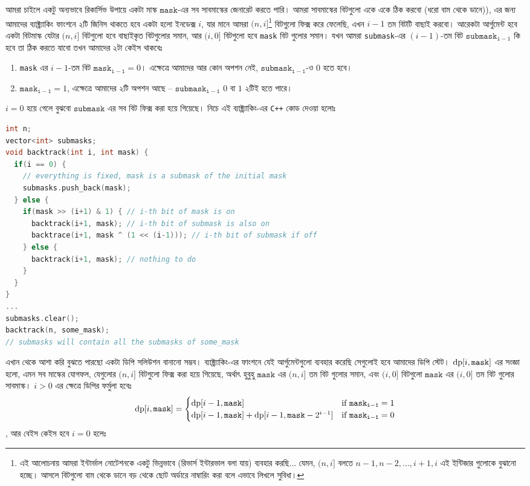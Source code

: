 আমরা চাইলে একটু অন্যভাবে রিকার্সিভ উপায়ে একটা মাস্ক $\mathtt{mask}$-এর সব
সাবমাস্কের জেনারেট
করতে পারি। আমরা সাবমাস্কের বিটগুলো একে একে ঠিক করবো (ধরো বাম থেকে ডানে)), এর
জন্য আমাদের ব্যাক্ট্র্যাকিং ফাংশনে ২টি জিনিস থাকতে হবে একটা হলো ইনডেক্স $i$,
যার মানে আমরা $(n, i]$\footnote{এই আলোচনায় আমরা ইন্টার্ভাল নোটেশনকে একটু
ভিন্নভাবে (রিভার্স ইন্টারভাল বলা যায়) ব্যবহার করছি$\ldots$ যেমন, $(n, i]$
বলতে
$n-1, n-2, \ldots, i+1, i$ এই ইন্টিজার গুলোকে বুঝানো হচ্ছে। আসলে বিটগুলো বাম
থেকে ডানে বড় থেকে ছোট অর্ডারে নাম্বারিং করা বলে এভাবে লিখলে সুবিধা।}
বিটগুলো ফিক্স করে ফেলেছি, এখন $i-1$ তম বিটটি বাছাই
করবো। আরেকটা আর্গুমেন্ট হবে একটা বিটমাস্ক যেটার $(n, i]$ বিটগুলো হবে বাছাইকৃত
বিটগুলোর সমান, আর $(i, 0]$ বিটগুলো হবে \texttt{mask} বিট গুলোর সমান। যখন আমরা
\texttt{submask}-এর $(i-1)$-তম বিট $\mathtt{submask_{i-1}}$ কি হবে তা ঠিক
করতে যাবো তখন আমাদের ২টা কেইস থাকবেঃ
\begin{enumerate}
  \item \texttt{mask} এর $i-1$-তম বিট $\mathtt{mask_{i-1}} = 0$। এক্ষেত্রে
  আমাদের আর কোন অপশন নেই, $\mathtt{submask_{i-1}}$-ও $0$ হতে হবে।
  \item $\mathtt{mask_{i-1}} = 1$, এক্ষেত্রে আমাদের ২টি অপশন আছে --
  $\mathtt{submask_{i-1}}$ $0$ বা $1$ ২টিই হতে পারে।
\end{enumerate}
$i = 0$ হয়ে গেলে বুঝবো $\mathtt{submask}$ এর সব বিট ফিক্স করা হয়ে গিয়েছে।
নিচে এই ব্যাক্ট্র্যাকিং-এর \texttt{C++} কোড দেওয়া হলোঃ
\begin{lstlisting}[language=C++]
int n;
vector<int> submasks;
void backtrack(int i, int mask) {
  if(i == 0) {
    // everything is fixed, mask is a submask of the initial mask
    submasks.push_back(mask);
  } else {
    if(mask >> (i+1) & 1) { // i-th bit of mask is on
      backtrack(i+1, mask); // i-th bit of submask is also on
      backtrace(i+1, mask ^ (1 << (i-1))); // i-th bit of submask if off
    } else {
      backtrack(i+1, mask); // nothing to do
    }
  }
}
...
submasks.clear();
backtrack(n, some_mask);
// submasks will contain all the submasks of some_mask
\end{lstlisting}
এখান থেকে আশা করি বুঝতে পারছো একটা ডিপি সলিউশন বানানো সম্ভব।
ব্যাক্ট্র্যাকিং-এর ফাংশনে যেই আর্গুমেন্টগুলো ব্যবহার করেছি সেগুলোই হবে আমাদের
ডিপি স্টেট। $\text{dp}[i, \mathtt{mask}]$ এর সংজ্ঞা হলো, এমন সব মাস্কের যোগফল,
যেগুলোর $(n, i]$ বিটগুলো ফিক্স করা হয়ে গিয়েছে, অর্থাৎ হুবুহু $\mathtt{mask}$
এর $(n, i]$ তম বিট গুলোর সমান, এবং $(i, 0]$ বিটগুলো $\mathtt{mask}$ এর $(i,
0]$ তম বিট গুলোর সাবমাস্ক। $i>0$ এর ক্ষেত্রে ডিপির ফর্মুলা হবেঃ
\[
  \text{dp}[i, \mathtt{mask}] = 
  \begin{cases}
    \text{dp}[i-1, \mathtt{mask}] &\text{if } \mathtt{mask_{i-1}} = 1\\
    \text{dp}[i-1, \mathtt{mask}] + \text{dp}[i-1, \mathtt{mask} - 2^{i-1}]
    &\text{if } \mathtt{mask_{i-1}} = 0
  \end{cases}
\], আর বেইস কেইস হবে $i=0$ হলেঃ

